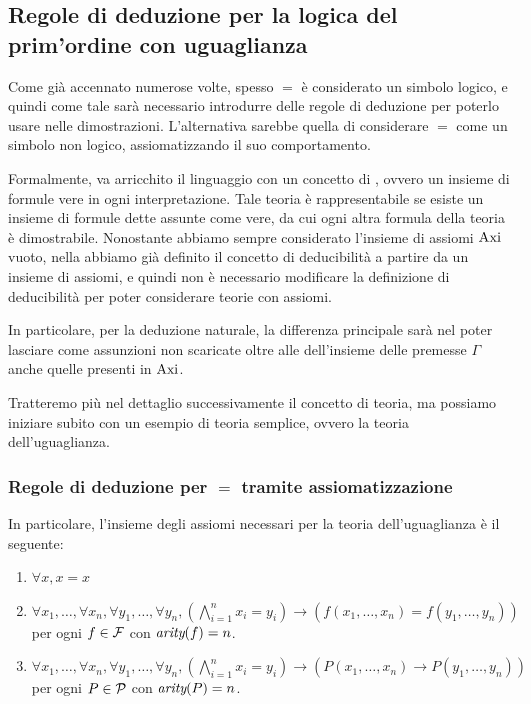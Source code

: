 \subsection{Regole di deduzione per la logica del prim'ordine con uguaglianza}

Come già accennato numerose volte, spesso \(=\) è considerato un simbolo logico, e quindi come tale sarà necessario introdurre delle regole di deduzione per poterlo usare nelle dimostrazioni. L'alternativa sarebbe quella di considerare \(=\) come un simbolo non logico, assiomatizzando il suo comportamento.

Formalmente, va arricchito il linguaggio con un concetto di , ovvero un insieme di formule vere in ogni interpretazione. Tale teoria è rappresentabile se esiste un insieme di formule dette  assunte come vere, da cui ogni altra formula della teoria è dimostrabile. Nonostante abbiamo sempre considerato l'insieme di assiomi \(\operatorname{Axi}\) vuoto, nella  abbiamo già definito il concetto di deducibilità a partire da un insieme di assiomi, e quindi non è necessario modificare la definizione di deducibilità per poter considerare teorie con assiomi.

In particolare, per la deduzione naturale, la differenza principale sarà nel poter lasciare come assunzioni non scaricate oltre alle dell'insieme delle premesse \(\Gamma\) anche quelle presenti in \(\operatorname{Axi}\).

Tratteremo più nel dettaglio successivamente il concetto di teoria, ma possiamo iniziare subito con un esempio di teoria semplice, ovvero la teoria dell'uguaglianza.

\subsubsection{Regole di deduzione per \(=\) tramite assiomatizzazione}

In particolare, l'insieme degli assiomi necessari per la teoria dell'uguaglianza è il seguente:

\begin{enumerate}
  \item \(\forall x, x=x\)
  \item \(\forall x_1,\ldots, \forall x_n, \forall y_1, \ldots, \forall y_n, (\bigwedge_{i=1}^n x_i = y_i) \to (f(x_1, \ldots, x_n) = f(y_1, \ldots, y_n))\) per ogni \(f \in \mathcal{F}\) con \(\operatorname{\textit{arity}}(f) = n\).
  \item \(\forall x_1,\ldots, \forall x_n, \forall y_1, \ldots, \forall y_n, (\bigwedge_{i=1}^n x_i = y_i) \to (P(x_1, \ldots, x_n) \to P(y_1, \ldots, y_n))\) per ogni \(P \in \mathcal{P}\) con \(\operatorname{\textit{arity}}(P) = n\).
\end{enumerate}

